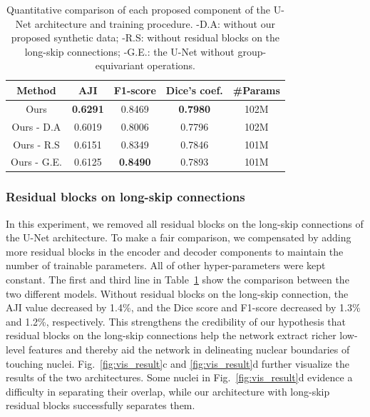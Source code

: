 \begin{table}
\centering
\begin{tabular}{|c|c|c|c|c|}
\hline
Method          & AJI    & F1-score & Dice's coef. & \#Params  \\ \hline
Ours        & \textbf{0.6291} & 0.8469   & \textbf{0.7980}             & 102M      \\
Ours - D.A  & 0.6019 & 0.8006   & 0.7796             & 102M      \\
Ours - R.S  & 0.6151 & 0.8349   & 0.7846             & 101M      \\
Ours - G.E. & 0.6125 & \textbf{0.8490}   & 0.7893             & 101M \\ \hline   
\end{tabular}
\caption{Quantitative comparison of each proposed component of the U-Net architecture and training procedure.
-D.A: without our proposed synthetic data; -R.S: without residual blocks on the long-skip connections;
-G.E.: the U-Net without group-equivariant operations.}
\label{tab:ablation}
\end{table}

\subsubsection*{Residual blocks on long-skip connections}
In this experiment, we removed all residual blocks on the long-skip connections of the U-Net architecture.
To make a fair comparison, we compensated by adding more residual blocks in the encoder and decoder components to maintain the number of trainable parameters.
All of other hyper-parameters were kept constant.
The first and third line in Table~\ref{tab:ablation} show the comparison between the two different models.
Without residual blocks on the long-skip connection, the AJI value decreased by 1.4\%, and the Dice score and F1-score decreased by 1.3\% and 1.2\%, respectively.
This strengthens the credibility of our hypothesis that residual blocks on the long-skip connections help the network extract richer low-level features and thereby aid the network in delineating nuclear boundaries of touching nuclei.
Fig.~\ref{fig:vis_result}c and \ref{fig:vis_result}d further visualize the results of the two architectures.
Some nuclei in Fig.~\ref{fig:vis_result}d evidence a difficulty in separating their overlap, while our architecture with long-skip residual blocks successfully separates them. 

